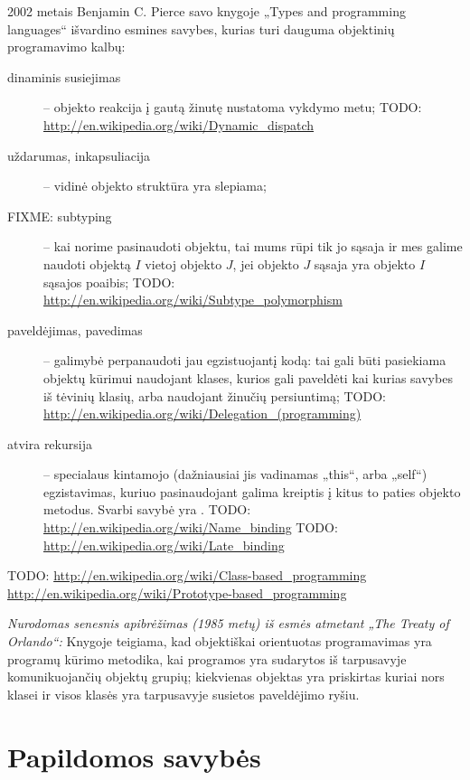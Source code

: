2002 metais Benjamin C. Pierce savo knygoje „Types and programming
languages“\cite[225-227]{types-and-programming-languages} išvardino
esmines savybes, kurias turi dauguma objektinių programavimo kalbų: 
\begin{description}
  \item[dinaminis susiejimas]  –
    objekto reakcija į gautą žinutę nustatoma vykdymo metu;
    TODO: \url{http://en.wikipedia.org/wiki/Dynamic_dispatch}
  \item[uždarumas, inkapsuliacija]  – vidinė objekto
    struktūra yra slepiama;
  \item[FIXME: subtyping]  – kai norime pasinaudoti objektu, 
    tai mums rūpi tik jo sąsaja ir mes galime naudoti objektą $I$ vietoj
    objekto $J$, jei objekto $J$ sąsaja yra objekto $I$ sąsajos poaibis;
    TODO: \url{http://en.wikipedia.org/wiki/Subtype_polymorphism}
  \item[paveldėjimas, pavedimas]  – galimybė
    perpanaudoti jau egzistuojantį kodą: tai gali būti pasiekiama
    objektų kūrimui naudojant klases, kurios gali paveldėti kai kurias
    savybes iš tėvinių klasių, arba naudojant žinučių persiuntimą;
    TODO: \url{http://en.wikipedia.org/wiki/Delegation_(programming)}
  \item[atvira rekursija]  – specialaus kintamojo
    (dažniausiai jis vadinamas „this“, arba „self“) egzistavimas, kuriuo
    pasinaudojant galima kreiptis į kitus to paties objekto metodus.
    Svarbi savybė yra .
    TODO: \url{http://en.wikipedia.org/wiki/Name_binding}
    TODO: \url{http://en.wikipedia.org/wiki/Late_binding}
\end{description}

TODO: \url{http://en.wikipedia.org/wiki/Class-based_programming}
\url{http://en.wikipedia.org/wiki/Prototype-based_programming}

\emph{Nurodomas senesnis apibrėžimas (1985 metų) iš esmės atmetant
„The Treaty of Orlando“:}
Knygoje \cite[41-42]{Booch:2007:OAD:1407387} teigiama, kad objektiškai
orientuotas programavimas yra programų kūrimo metodika, kai programos
yra sudarytos iš tarpusavyje komunikuojančių objektų grupių; kiekvienas
objektas yra priskirtas kuriai nors klasei ir visos klasės yra
tarpusavyje susietos paveldėjimo ryšiu.

\section{Papildomos savybės}

